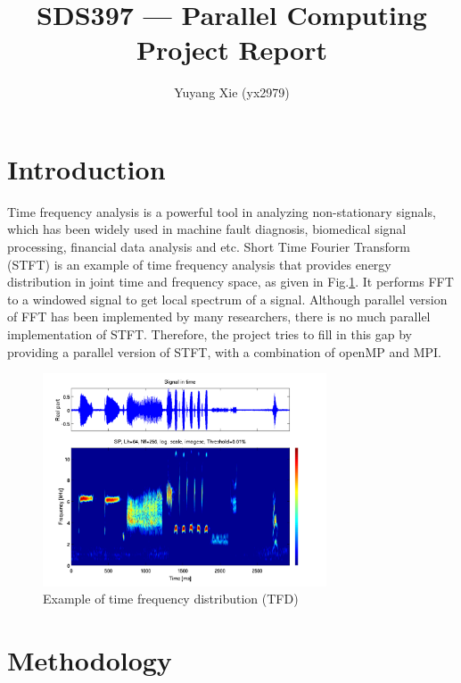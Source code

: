 \documentclass[11pt,letter]{article}
\begin{document}

\title{SDS397 --- Parallel Computing Project Report}

\author{Yuyang Xie (yx2979)}
 
\maketitle 

\section{Introduction}
Time frequency analysis is a powerful tool in analyzing non-stationary signals, which has been widely used in machine fault diagnosis, biomedical signal processing, financial data analysis and etc. Short Time Fourier Transform (STFT) is an example of time frequency analysis that provides energy distribution in joint time and frequency space, as given in Fig.\ref{fig:example_tfd}. It performs FFT to a windowed signal to get local spectrum of a signal. Although parallel version of FFT has been implemented by many researchers, there is no much parallel implementation of STFT. Therefore, the project tries to fill in this gap by providing a parallel version of STFT, with a combination of openMP and MPI.

\begin{figure}[H]
\centering
\includegraphics[width = 0.75\textwidth]{fig/example_tfd.png}
\caption{Example of time frequency distribution (TFD) \cite{TFTB-38:online}}
\label{fig:example_tfd}
\end{figure}

\section{Methodology}
\end{document}

